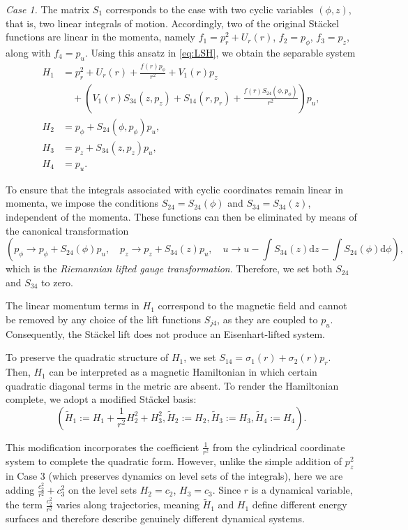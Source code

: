 \documentclass[10pt]{amsart}
\numberwithin{equation}{section}
\theoremstyle{definition}
\begin{document}
\textit{Case 1.} The matrix $S_1$ corresponds to the case with two cyclic variables $(\phi, z)$, that is, two linear integrals of motion. Accordingly, two of the original St\"ackel functions are linear in the momenta, namely $f_1 = p_r^2 + U_r(r)$, $f_2 = p_{\phi}$, $f_3 = p_z$, along with $f_4 = p_u$.
Using this ansatz in \eqref{eq:LSH}, we obtain the separable system
\begin{equation}
	\begin{split}
		H_1 &= p_r^{2}+U_r(r)+\frac{f(r) p_\phi}{r^{2}}+V_1(r) p_z \\
		&\quad + \left(V_1(r) S_{34}(z, p_z) +S_{14}(r, p_r)+\frac{f(r) S_{24}(\phi, p_\phi)}{r^{2}}\right) p_u, \\
		H_2 &= p_\phi +S_{24}(\phi, p_\phi) p_u, \\
		H_3 &= p_z +S_{34}(z, p_z) p_u, \\
		H_4 &= p_u.
	\end{split}
\end{equation}

To ensure that the integrals associated with cyclic coordinates remain linear in momenta, we impose the conditions $S_{24} = S_{24}(\phi)$ and $S_{34} = S_{34}(z)$, independent of the momenta. These functions can then be eliminated by means of the canonical transformation
\begin{equation}
	(p_{\phi}\to p_{\phi}+S_{24}(\phi)p_u, \quad p_z\to p_z+S_{34}(z) p_u, \quad u\to u-\int S_{34}(z) \mathrm{d} z-\int S_{24}(\phi) \mathrm{d} \phi),
\end{equation}
which is the \textit{Riemannian lifted gauge transformation}. Therefore, we set both $S_{24}$ and $S_{34}$ to zero. 

The linear momentum terms in $H_1$ correspond to the magnetic field and cannot be removed by any choice of the lift functions $S_{j4}$, as they are coupled to $p_u$. Consequently, the St\"ackel lift does not produce an Eisenhart-lifted system.

To preserve the quadratic structure of $H_1$, we set $S_{14}=\sigma_1(r)+\sigma_2(r) p_r$. Then, $H_1$ can be interpreted as a magnetic Hamiltonian in which certain quadratic diagonal terms in the metric are absent. To render the Hamiltonian complete, we adopt a modified Stäckel basis:
\begin{equation}
	(\tilde{H}_1:=H_1+\frac{1}{r^2}H_2^2+H_3^2,\tilde{H}_2:=H_2,\tilde{H}_3:=H_3,\tilde{H}_4:=H_4).
\end{equation}

This modification incorporates the coefficient $\frac{1}{r^2}$ from the cylindrical coordinate system to complete the quadratic form. However, unlike the simple addition of $p_z^2$ in Case 3 (which preserves dynamics on level sets of the integrals), here we are adding $\frac{c_2^2}{r^2} + c_3^2$ on the level sets $H_2 = c_2$, $H_3 = c_3$. Since $r$ is a dynamical variable, the term $\frac{c_2^2}{r^2}$ varies along trajectories, meaning $\tilde{H}_1$ and $H_1$ define different energy surfaces and therefore describe genuinely different dynamical systems.
\end{document}
